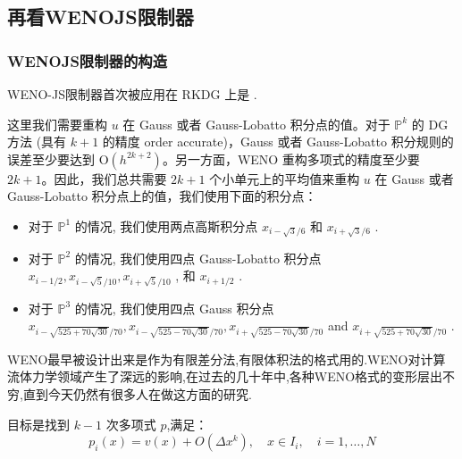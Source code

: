 \documentclass{book}
\begin{document}
\begin{example}
\begin{example}{}{}
\begin{example}
\begin{example}
\begin{example}
\subsection{再看WENOJS限制器}
\begin{figure}
    \centering
\end{figure}
\subsubsection{WENOJS限制器的构造}
WENO-JS限制器首次被应用在 RKDG 上是 \cite{RKDG+WENOJS-1,RKDG+WENOJS-2}.



这里我们需要重构 $u$ 在 Gauss 或者 Gauss-Lobatto 积分点的值。对于 $\mathbb{P}^{k}$ 的 DG 方法 (具有 $k+1$ 的精度 order accurate)，Gauss 或者 Gauss-Lobatto 积分规则的误差至少要达到 $\mathrm{O}\left(h^{2 k+2}\right)$。另一方面，WENO 重构多项式的精度至少要 $2 k+1$。因此，我们总共需要 $2k+1$ 个小单元上的平均值来重构 $u$ 在 Gauss 或者 Gauss-Lobatto 积分点上的值，我们使用下面的积分点：

\begin{itemize}
    \item 对于  $\mathbb{P}^{1}$  的情况, 我们使用两点高斯积分点  $x_{i-\sqrt{3} / 6}$  和  $x_{i+\sqrt{3} / 6}$ .
    \item 对于  $\mathbb{P}^{2}$  的情况, 我们使用四点 Gauss-Lobatto 积分点  $x_{i-1 / 2}, x_{i-\sqrt{5} / 10}, x_{i+\sqrt{5} / 10}$ , 和  $x_{i+1 / 2}$ .
    \item 对于  $\mathbb{P}^{3}$  的情况, 我们使用四点 Gauss 积分点  $x_{i-\sqrt{525+70 \sqrt{30}} / 70}, x_{i-\sqrt{525-70 \sqrt{30}} / 70}, x_{i+\sqrt{525-70 \sqrt{30}} / 70}$  and  $x_{i+\sqrt{525+70 \sqrt{30}} / 70}$ .
\end{itemize}

WENO最早被设计出来是作为有限差分法,有限体积法的格式用的.WENO对计算流体力学领域产生了深远的影响,在过去的几十年中,各种WENO格式的变形层出不穷,直到今天仍然有很多人在做这方面的研究.

目标是找到 $k-1$ 次多项式 $p$,满足：
\begin{equation}
    p_{i}(x)=v(x)+O\left(\Delta x^{k}\right), \quad x \in I_{i}, \quad i=1, \ldots, N
\end{equation}


\end{example}
\end{example}
\end{example}
\end{example}
\end{example}
\end{document}
